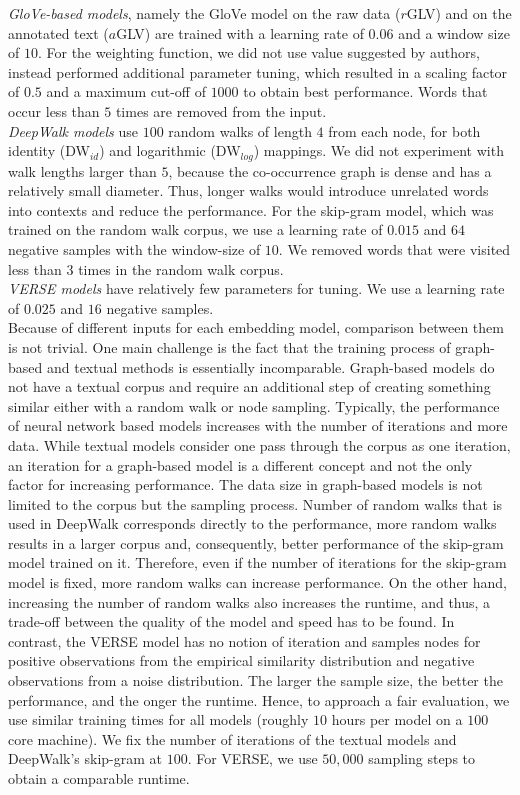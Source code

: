 \noindent
\emph{GloVe-based models}, namely the GloVe model on the raw data ($r$GLV) and on the annotated text ($a$GLV) are trained with a learning rate of $0.06$ and a window size of $10$. For the weighting function, we did not use value suggested by authors, instead performed additional parameter tuning, which resulted in a scaling factor of $0.5$ and a maximum cut-off of $1000$ to obtain best performance. Words that occur less than $5$ times are removed from the input.\\

\noindent
\emph{DeepWalk models} use $100$ random walks of length $4$ from each node, for both identity (DW$_{id}$) and logarithmic (DW$_{log}$) mappings. We did not experiment with walk lengths larger than $5$, because the co-occurrence graph is dense and has a relatively small diameter. Thus, longer walks would introduce unrelated words into contexts and reduce the performance. For the skip-gram model, which was trained on the random walk corpus, we use a learning rate of $0.015$ and $64$ negative samples with the window-size of $10$. We removed words that were visited less than $3$ times in the random walk corpus. \\

\noindent
\emph{VERSE models} have relatively few parameters for tuning. We use a learning rate of $0.025$ and $16$ negative samples.\\

\noindent
Because of different inputs for each embedding model, comparison between them is not trivial. One main challenge is the fact that the training process of graph-based and textual methods is essentially incomparable. Graph-based models do not have a textual corpus and require an additional step of creating something similar either with a random walk or node sampling. Typically, the performance of neural network based models increases with the number of iterations and more data. While textual models consider one pass through the corpus as one iteration, an iteration for a graph-based model is a different concept and not the only factor for increasing performance. The data size in graph-based models is not limited to the corpus but the sampling process. Number of random walks that is used in DeepWalk corresponds directly to the performance, more random walks results in a larger corpus and, consequently, better performance of the skip-gram model trained on it. Therefore, even if the number of iterations for the skip-gram model is fixed, more random walks can increase performance. On the other hand, increasing the number of random walks also increases the runtime, and thus, a trade-off between the quality of the model and speed has to be found. In contrast, the VERSE model has no notion of iteration and samples nodes for positive observations from the empirical similarity distribution and negative observations from a noise distribution. The larger the sample size, the better the performance, and the onger the runtime. Hence, to approach a fair evaluation, we use similar training times for all models (roughly $10$ hours per model on a $100$ core machine). We fix the number of iterations of the textual models and DeepWalk's skip-gram at $100$. For VERSE, we use $50,000$ sampling steps to obtain a comparable runtime.
